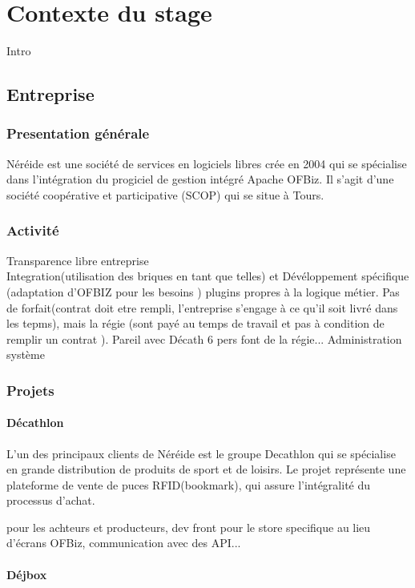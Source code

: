 \chapter{Contexte du stage}

Intro

\section{Entreprise}

\subsection{Presentation générale }
Néréide est une société de services en logiciels libres crée en 2004 qui se spécialise dans l'intégration du progiciel de gestion intégré Apache OFBiz. Il s'agit d'une société coopérative et participative (SCOP) qui se situe à Tours. 



\subsection{Activité}
\label{activite}
Transparence libre entreprise \\


Integration(utilisation des briques en tant que telles) et
Dévéloppement spécifique (adaptation d'OFBIZ pour les besoins ) plugins propres à la logique métier. Pas de forfait(contrat doit etre rempli, l'entreprise s'engage à ce qu'il soit livré dans les tepms), mais la régie (sont payé au temps de travail et pas à condition de remplir un contrat ).  Pareil avec Décath 6 pers font de la régie...
Administration système
\subsection{Projets}
\subsubsection{Décathlon}
L'un des principaux clients de Néréide est le groupe Decathlon qui se spécialise en grande distribution de produits de sport et de loisirs. 
Le projet représente une plateforme de vente de puces RFID(bookmark), qui assure l'intégralité du processus d'achat.

pour les achteurs et producteurs, dev front pour le store specifique au lieu d'écrans OFBiz, communication avec des API...

\subsubsection{Déjbox}

